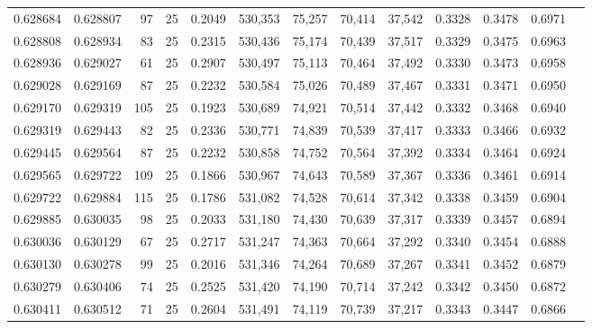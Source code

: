 \begin{tabular}{rrrrrrrrrrrrr}
0.628684 & 0.628807 &    97 &  25 &                                     0.2049 & 530,353 &  75,257 &  70,414 &  37,542 & 0.3328 & 0.3478 & 0.6971 \\
0.628808 & 0.628934 &    83 &  25 &                                     0.2315 & 530,436 &  75,174 &  70,439 &  37,517 & 0.3329 & 0.3475 & 0.6963 \\
0.628936 & 0.629027 &    61 &  25 &                                     0.2907 & 530,497 &  75,113 &  70,464 &  37,492 & 0.3330 & 0.3473 & 0.6958 \\
0.629028 & 0.629169 &    87 &  25 &                                     0.2232 & 530,584 &  75,026 &  70,489 &  37,467 & 0.3331 & 0.3471 & 0.6950 \\
0.629170 & 0.629319 &   105 &  25 &                                     0.1923 & 530,689 &  74,921 &  70,514 &  37,442 & 0.3332 & 0.3468 & 0.6940 \\
0.629319 & 0.629443 &    82 &  25 &                                     0.2336 & 530,771 &  74,839 &  70,539 &  37,417 & 0.3333 & 0.3466 & 0.6932 \\
0.629445 & 0.629564 &    87 &  25 &                                     0.2232 & 530,858 &  74,752 &  70,564 &  37,392 & 0.3334 & 0.3464 & 0.6924 \\
0.629565 & 0.629722 &   109 &  25 &                                     0.1866 & 530,967 &  74,643 &  70,589 &  37,367 & 0.3336 & 0.3461 & 0.6914 \\
0.629722 & 0.629884 &   115 &  25 &                                     0.1786 & 531,082 &  74,528 &  70,614 &  37,342 & 0.3338 & 0.3459 & 0.6904 \\
0.629885 & 0.630035 &    98 &  25 &                                     0.2033 & 531,180 &  74,430 &  70,639 &  37,317 & 0.3339 & 0.3457 & 0.6894 \\
0.630036 & 0.630129 &    67 &  25 &                                     0.2717 & 531,247 &  74,363 &  70,664 &  37,292 & 0.3340 & 0.3454 & 0.6888 \\
0.630130 & 0.630278 &    99 &  25 &                                     0.2016 & 531,346 &  74,264 &  70,689 &  37,267 & 0.3341 & 0.3452 & 0.6879 \\
0.630279 & 0.630406 &    74 &  25 &                                     0.2525 & 531,420 &  74,190 &  70,714 &  37,242 & 0.3342 & 0.3450 & 0.6872 \\
0.630411 & 0.630512 &    71 &  25 &                                     0.2604 & 531,491 &  74,119 &  70,739 &  37,217 & 0.3343 & 0.3447 & 0.6866 \\

\end{tabular}
